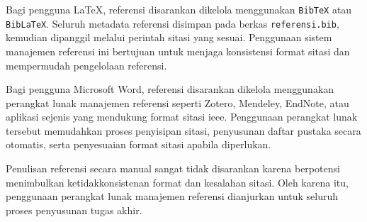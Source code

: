 Bagi pengguna \LaTeX, referensi disarankan dikelola menggunakan \texttt{BibTeX} atau \texttt{BibLaTeX}. Seluruh metadata referensi disimpan pada berkas \texttt{referensi.bib}, kemudian dipanggil melalui perintah sitasi yang sesuai. Penggunaan sistem manajemen referensi ini bertujuan untuk menjaga konsistensi format sitasi dan mempermudah pengelolaan referensi.

Bagi pengguna Microsoft Word, referensi disarankan dikelola menggunakan perangkat lunak manajemen referensi seperti Zotero, Mendeley, EndNote, atau aplikasi sejenis yang mendukung format sitasi \gls{ieee}. Penggunaan perangkat lunak tersebut memudahkan proses penyisipan sitasi, penyusunan daftar pustaka secara otomatis, serta penyesuaian format sitasi apabila diperlukan.

Penulisan referensi secara manual sangat tidak disarankan karena berpotensi menimbulkan ketidakkonsistenan format dan kesalahan sitasi. Oleh karena itu, penggunaan perangkat lunak manajemen referensi dianjurkan untuk seluruh proses penyusunan tugas akhir.
